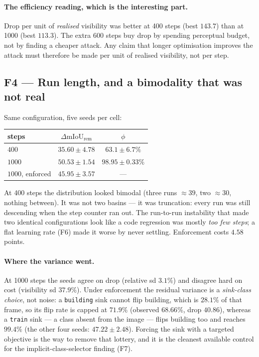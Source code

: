 \documentclass[11pt,a4paper]{article}
\begin{document}
\paragraph{The efficiency reading, which is the interesting part.}
Drop per unit of \emph{realised} visibility was better at 400 steps (best
$143.7$) than at 1000 (best $113.3$). The extra 600 steps buy drop by
spending perceptual budget, not by finding a cheaper attack. Any claim that
longer optimisation improves the attack must therefore be made per unit of
realised visibility, not per step.

\subsection{F4 --- Run length, and a bimodality that was not real}

Same configuration, five seeds per cell:
\begin{center}
\begin{tabular}{@{}lcc@{}}
\toprule
steps & $\Delta\mathrm{mIoU}_{\mathrm{rem}}$ & $\phi$ \\
\midrule
$400$  & $35.60\pm4.78$ & $63.1\pm6.7\%$ \\
$1000$ & $50.53\pm1.54$ & $98.95\pm0.33\%$ \\
$1000$, enforced & $45.95\pm3.57$ & --- \\
\bottomrule
\end{tabular}
\end{center}
At 400 steps the distribution looked bimodal (three runs $\approx39$, two
$\approx30$, nothing between). It was not two basins --- it was truncation:
every run was still descending when the step counter ran out. The
run-to-run instability that made two identical configurations look like a
code regression was mostly \emph{too few steps}; a flat learning rate (F6)
made it worse by never settling. Enforcement costs $4.58$ points.

\paragraph{Where the variance went.}
At 1000 steps the seeds agree on drop (relative sd $3.1\%$) and disagree
hard on cost (visibility sd $37.9\%$). Under enforcement the residual
variance is a \emph{sink-class choice}, not noise: a \texttt{building} sink
cannot flip building, which is $28.1\%$ of that frame, so its flip rate is
capped at $71.9\%$ (observed $68.66\%$, drop $40.86$), whereas a
\texttt{train} sink --- a class absent from the image --- flips building too
and reaches $99.4\%$ (the other four seeds: $47.22\pm2.48$). Forcing the
sink with a targeted objective is the way to remove that lottery, and it is
the cleanest available control for the implicit-class-selector finding (F7).
\end{document}
